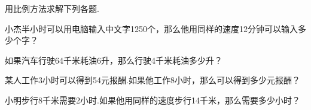 用比例方法求解下列各题. 

\begin{subquestions}

    \subquestion 小杰半小时可以用电脑输入中文字1250个，那么他用同样的速度12分钟可以输入多少个字？

    \subquestion 如果汽车行驶64千米耗油6升，那么行驶4千米耗油多少升？

    \subquestion 某人工作3小时可以得到54元报酬.如果他工作8小时，那么可以得到多少元报酬？

    \subquestion 小明步行8千米需要2小时.如果他用同样的速度步行14千米，那么需要多少小时？     

\end{subquestions}



